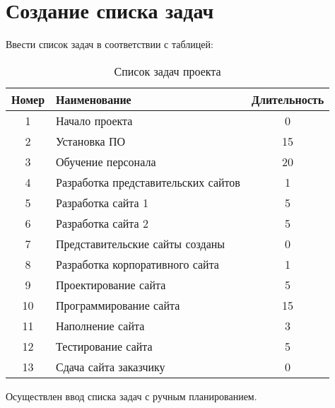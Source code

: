
\chapter{Создание списка задач}

Ввести список задач в соответствии с таблицей:

\begin{table}[!h]
    \begin{center}
        \caption{Список задач проекта}
        \begin{tabular}{|c|l|c|}
            \hline
            \bfseries Номер & \bfseries Наименование & \bfseries Длительность \\\hline
            1 & Начало проекта & 0 \\
            2 & Установка ПО & 15 \\
            3 & Обучение персонала & 20 \\
            4 & Разработка представительских сайтов & 1 \\
            5 & Разработка сайта 1 & 5 \\
            6 & Разработка сайта 2 & 5 \\
            7 & Представительские сайты созданы & 0 \\
            8 & Разработка корпоративного сайта & 1 \\
            9 & Проектирование сайта & 5 \\
            10 & Программирование сайта & 15 \\
            11 & Наполнение сайта & 3 \\
            12 & Тестирование сайта & 5 \\
            13 & Сдача сайта заказчику & 0 \\
            \hline
        \end{tabular}
    \end{center}
\end{table}

Осуществлен ввод списка задач с ручным планированием.

